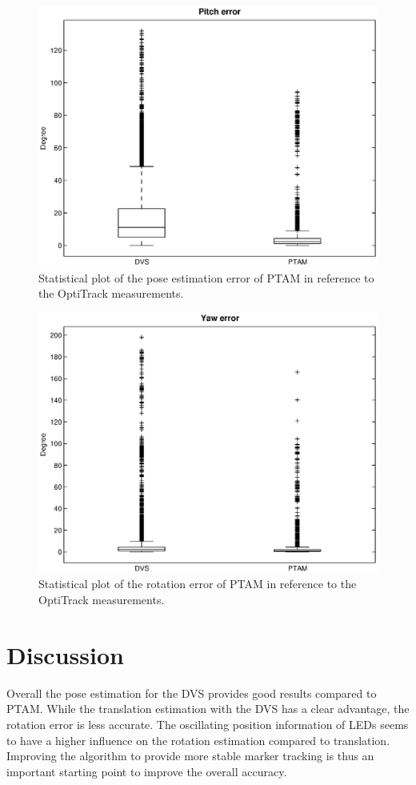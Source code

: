 \begin{figure}[h]
     \centering
     \includegraphics[width=1.0\textwidth]{img/pitch_error_box.eps}
     \caption{Statistical plot of the pose estimation error of PTAM in reference to the OptiTrack measurements.}
     \label{img:pitch_error_box}
\end{figure}

\begin{figure}[h]
     \centering
     \includegraphics[width=1.0\textwidth]{img/yaw_error_box.eps}
     \caption{Statistical plot of the rotation error of PTAM in reference to the OptiTrack measurements.}
     \label{img:yaw_error_box}
\end{figure}


\section{Discussion}\label{sec:eval_discussion}

Overall the pose estimation for the DVS provides good results compared to PTAM. While the translation estimation with the DVS has a clear advantage, the rotation error is less accurate. The oscillating position information of LEDs seems to have a higher influence on the rotation estimation compared to translation. Improving the algorithm to provide more stable marker tracking is thus an important starting point to improve the overall accuracy.